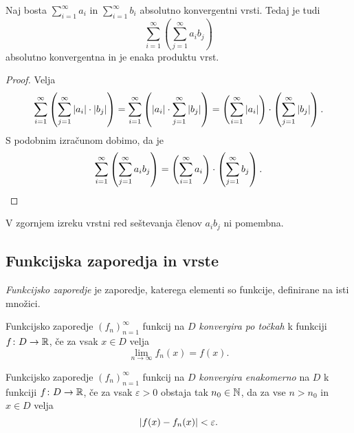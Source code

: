 \documentclass[12pt, a4paper]{article}
\begin{document}
\begin{izrek}
Naj bosta $\displaystyle\sum_{i=1}^\infty a_i$ in $\displaystyle\sum_{i=1}^\infty b_i$ absolutno konvergentni vrsti. Tedaj je tudi
\[
\sum_{i=1}^\infty\left(\sum_{j=1}^\infty a_ib_j\right)
\]
absolutno konvergentna in je enaka produktu vrst.
\end{izrek}

\begin{proof}
Velja
\[
\sum_{i=1}^\infty\left(\sum_{j=1}^\infty \left\lvert a_i\right\rvert\cdot\left\lvert b_j\right\rvert\right)=\sum_{i=1}^\infty\left(\left\lvert a_i\right\rvert\cdot\sum_{j=1}^\infty \left\lvert b_j\right\rvert\right)=\left(\sum_{i=1}^\infty \left\lvert a_i\right\rvert\right)\cdot\left(\sum_{j=1}^\infty \left\lvert b_j\right\rvert\right).
\]
S podobnim izračunom dobimo, da je
\[
\sum_{i=1}^\infty\left(\sum_{j=1}^\infty a_i b_j\right)=\left(\sum_{i=1}^\infty a_i\right)\cdot\left(\sum_{j=1}^\infty b_j\right).\qedhere
\]
\end{proof}

\begin{opomba}
V zgornjem izreku vrstni red seštevanja členov $a_ib_j$ ni pomembna.
\end{opomba}

\newpage

\subsection{Funkcijska zaporedja in vrste}

\begin{okvir}
\begin{definicija}
\emph{Funkcijsko zaporedje} je zaporedje, katerega elementi so funkcije, definirane na isti množici.
\end{definicija}
\end{okvir}

\begin{definicija}
Funkcijsko zaporedje $(f_n)_{n=1}^\infty$ funkcij na $D$ \emph{konvergira po točkah} k funkciji $f\colon D\to\mathbb{R}$, če za vsak $x\in D$ velja
\[
\lim_{n\to\infty} f_n(x)=f(x).
\]
\end{definicija}

\begin{definicija}
Funkcijsko zaporedje $(f_n)_{n=1}^\infty$ funkcij na $D$ \emph{konvergira enakomerno} na $D$ k funkciji $f\colon D\to\mathbb{R}$, če za vsak $\varepsilon>0$ obstaja tak $n_0\in\mathbb{N}$, da za vse $n>n_0$ in $x\in D$ velja
\[
\left\lvert f(x)-f_n(x)\right\rvert<\varepsilon.
\]
\end{definicija}
\end{document}

